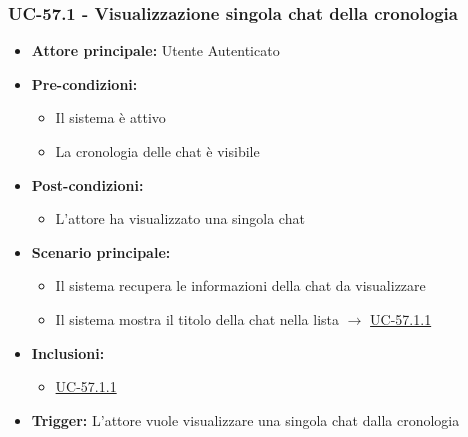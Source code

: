\documentclass[a4paper,12pt]{article}
\begin{document}
\subsubsection{UC-57.1 - Visualizzazione singola chat della cronologia} \label{subsec:UC-57.1}
\begin{itemize}
    \item \textbf{Attore principale:} Utente Autenticato
    \item \textbf{Pre-condizioni:}
    \begin{itemize}
        \item Il sistema è attivo
        \item La cronologia delle chat è visibile
    \end{itemize}
    \item \textbf{Post-condizioni:} 
    \begin{itemize}
        \item L'attore ha visualizzato una singola chat
    \end{itemize}
    \item \textbf{Scenario principale:} 
    \begin{itemize}
        \item Il sistema recupera le informazioni della chat da visualizzare
        \item Il sistema mostra il titolo della chat nella lista $\rightarrow$ \hyperref[subsec:UC-57.1.1]{UC-57.1.1}
    \end{itemize}
    \item \textbf{Inclusioni:}
    \begin{itemize}
        \item \hyperref[subsec:UC-57.1.1]{UC-57.1.1}
    \end{itemize}
    \item \textbf{Trigger:} L'attore vuole visualizzare una singola chat dalla cronologia

\end{itemize}
\end{document}
